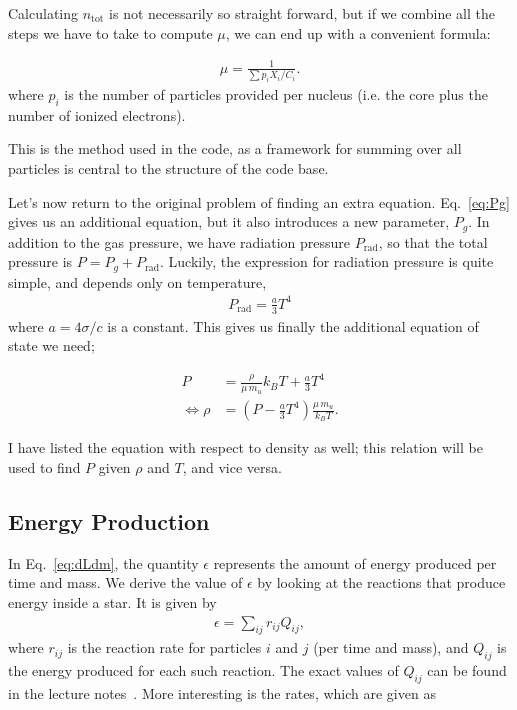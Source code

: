 \documentclass[11pt,twocolumn]{article}
\begin{document}
Calculating $n_\text{tot}$ is not necessarily so straight forward, but
if we combine all the steps we have to take to compute $\mu$, we can
end up with a convenient formula:

\begin{align}
  \mu = \frac{1}{\sum p_iX_i/C_i}\label{eq:mu_0}.
\end{align}
where $p_i$ is the number of particles provided per nucleus (i.e. the
core plus the number of ionized electrons).

This is the method used in the code, as a framework for summing over
all particles is central to the structure of the code base.


Let's now return to the original problem of finding an extra
equation. Eq.~\eqref{eq:Pg} gives us an additional equation, but it
also introduces a new parameter, $P_g$. In addition to the gas
pressure, we have radiation pressure $P_{\text{rad}}$, so that the
total pressure is $P = P_g + P_\text{rad}$. Luckily, the expression
for radiation pressure is quite simple, and depends only on
temperature,
\begin{align}
  P_\text{rad} = \frac{ a }{ 3 }T^4
\end{align}
where $a = 4\sigma/c$ is a constant. This gives us finally the
additional equation of state we need;

\begin{align}
  P &= \frac{ \rho }{ \mu\,m_u }k_B T + \frac{ a }{ 3 }T^4\label{eq:P-eq_state}\\
  \Leftrightarrow \rho &= (P - \frac{a}{3}T^4) \frac{ \mu\,m_u }{ k_BT }\label{eq:rho-eq_state}.
\end{align}

I have listed the equation with respect to density as well; this
relation will be used to find $P$ given $\rho$ and $T$, and vice
versa.


\subsection{Energy Production}
In Eq.~\eqref{eq:dLdm}, the quantity $\epsilon$ represents the amount
of energy produced per time and mass. We derive the value of
$\epsilon$ by looking at the reactions that produce energy inside a
star. It is given by
\begin{align}
  \epsilon = \sum_{ij}r_{ij}Q_{ij},
\end{align}
where $r_{ij}$ is the reaction rate for particles $i$ and $j$ (per
time and mass), and $Q_{ij}$ is the energy produced for each such
reaction. The exact values of $Q_{ij}$ can be found in the lecture
notes~\cite{lecture-notes}. More interesting is the rates, which are
given as
\end{document}
